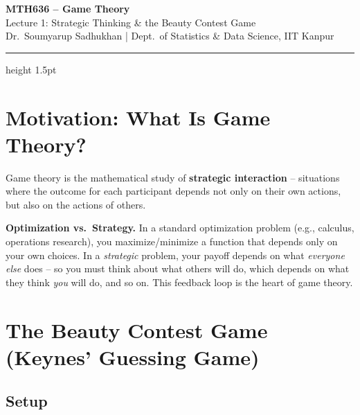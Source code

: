 \documentclass[12pt, a4paper]{article}
\begin{document}
\begin{center}
  {\LARGE\bfseries\sffamily\color{defblue} MTH636 -- Game Theory}\\[6pt]
  {\Large\sffamily Lecture 1: Strategic Thinking \& the Beauty Contest Game}\\[4pt]
  {\normalsize\sffamily Dr.\ Soumyarup Sadhukhan \quad | \quad Dept.\ of Statistics \& Data Science, IIT Kanpur}
\end{center}
\vspace{0.5cm}
\hrule height 1.5pt
\vspace{0.3cm}

\tableofcontents
\newpage

\section{Motivation: What Is Game Theory?}

Game theory is the mathematical study of \textbf{strategic interaction} -- situations where the outcome for each participant depends not only on their own actions, but also on the actions of others.

\begin{intubox}
  \textbf{Optimization vs.\ Strategy.}
  In a standard optimization problem (e.g., calculus, operations research), you maximize/minimize a function that depends only on your own choices. In a \emph{strategic} problem, your payoff depends on what \emph{everyone else} does -- so you must think about what others will do, which depends on what they think \emph{you} will do, and so on. This feedback loop is the heart of game theory.
\end{intubox}

\section{The Beauty Contest Game (Keynes' Guessing Game)}

\subsection{Setup}
\end{document}
